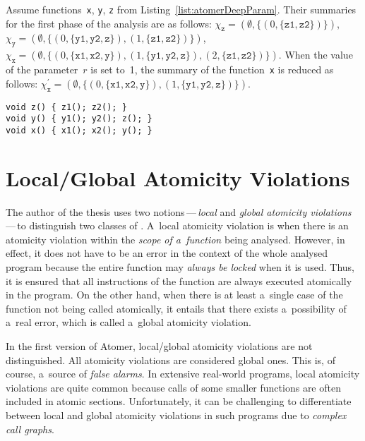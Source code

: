 \begin{example}
    Assume functions~\texttt{x}, \texttt{y}, \texttt{z} from Listing~\ref{list:atomerDeepParam}. Their summaries for the first phase of the analysis are as follows: $ \chi_\mathtt{z} = (\emptyset, \{(0, \{\mathtt{z1, z2}\})\}) $, $ \chi_\mathtt{y} = (\emptyset, \{(0, \{\mathtt{y1, y2, z}\}), \allowbreak (1, \{\mathtt{z1, z2}\})\}) $, $ \chi_\mathtt{x} = (\emptyset, \{(0, \{\mathtt{x1, x2, y}\}), (1, \{\mathtt{y1, y2, z}\}), (2, \{\mathtt{z1, z2}\})\}) $. When the value of the parameter~$ r $ is set to~1, the summary of the function~\texttt{x} is reduced as follows: $ \chi_\mathtt{x}^\prime = (\emptyset, \{(0, \{\mathtt{x1, x2, y}\}), (1, \{\mathtt{y1, y2, z}\})\}) $.
\end{example}

\begin{lstlisting}[style=c, label={list:atomerDeepParam}, float=hbt, caption={A~code snippet used to illustrate the \emph{limitation of considered nested functions}}]
void z() { z1(); z2(); }
void y() { y1(); y2(); z(); }
void x() { x1(); x2(); y(); }
\end{lstlisting}


\section{Local/Global Atomicity Violations}
\label{sec:proposalLocalGlobalViols}

The author of the thesis uses two notions\,---\,\emph{local} and \emph{global atomicity violations}\,---\,to distinguish two classes of . A~local atomicity violation is when there is an atomicity violation within the \emph{scope of a~function} being analysed. However, in effect, it does not have to be an error in the context of the whole analysed program because the entire function may \emph{always be locked} when it is used. Thus, it is ensured that all instructions of the function are always executed atomically in the program. On the other hand, when there is at least a~single case of the function not being called atomically, it entails that there exists a~possibility of a~real error, which is called a~global atomicity violation.

In the first version of Atomer, local/global atomicity violations are not distinguished. All atomicity violations are considered global ones. This is, of course, a~source of \emph{false alarms}. In extensive real-world programs, local atomicity violations are quite common because calls of some smaller functions are often included in atomic sections. Unfortunately, it can be challenging to differentiate between local and global atomicity violations in such programs due to \emph{complex call graphs}.

